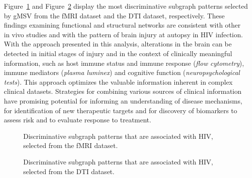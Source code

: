 \documentclass[conference]{IEEEtran}
\newcommand{\galgo}[0]{gMSV}
\newcommand{\neu}[0]{\emph{neuropsychological tests}}
\newcommand{\flo}[0]{\emph{flow cytometry}}
\newcommand{\pla}[0]{\emph{plasma luminex}}
\begin{document}
Figure~\ref{fig:fMRI_fea} and Figure~\ref{fig:DTI_fea} display the most discriminative subgraph patterns selected by {\galgo} from the fMRI dataset and the DTI dataset, respectively. These findings examining functional and structural networks are consistent with other in vivo studies \cite{castelo2006altered,wang2011abnormalities} and with the pattern of brain injury at autopsy \cite{everall1993neuronal,langford2003changing} in HIV infection. With the approach presented in this analysis, alterations in the brain can be detected in initial stages of injury and in the context of clinically meaningful information, such as host immune status and immune response ({\flo}), immune mediators ({\pla}) and cognitive function ({\neu}). This approach optimizes the valuable information inherent in complex clinical datasets. Strategies for combining various sources of clinical information have promising potential for informing an understanding of  disease mechanisms, for identification of new therapeutic targets and for discovery of biomarkers to assess risk and to evaluate response to treatment.

\begin{figure}[!ht]
\centering
\caption{Discriminative subgraph patterns that are associated with HIV, selected from the fMRI dataset.}\label{fig:fMRI_fea}
\end{figure}\begin{figure}[!ht]
\centering
\caption{Discriminative subgraph patterns that are associated with HIV, selected from the DTI dataset.}\label{fig:DTI_fea}
\end{figure}
\end{document}
